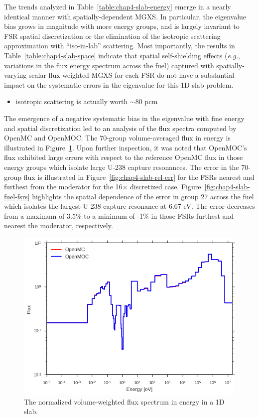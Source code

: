 The trends analyzed in Table~\ref{table:chap4-slab-energy} emerge in a nearly identical manner with spatially-dependent \ac{MGXS}. In particular, the eigenvalue bias grows in magnitude with more energy groups, and is largely invariant to \ac{FSR} spatial discretization or the elimination of the isotropic scattering approximation with ``iso-in-lab'' scattering. Most importantly, the results in Table~\ref{table:chap4-slab-space} indicate that spatial self-shielding effects (\textit{e.g.}, variations in the flux energy spectrum across the fuel) captured with spatially-varying scalar flux-weighted \ac{MGXS} for each \ac{FSR} do not have a substantial impact on the systematic errors in the eigenvalue for this 1D slab problem.

\begin{itemize}[noitemsep]
\item isotropic scattering is actually worth $\sim$80 pcm
\end{itemize}

The emergence of a negative systematic bias in the eigenvalue with fine energy and spatial discretization led to an analysis of the flux spectra computed by OpenMC and OpenMOC. The 70-group volume-averaged flux in energy is illustrated in Figure~\ref{fig:chap4-slab-flux}. Upon further inspection, it was noted that OpenMOC's flux exhibited large errors with respect to the reference OpenMC flux in those energy groups which isolate large U-238 capture resonances. The error in the 70-group flux is illustrated in Figure~\ref{fig:chap4-slab-rel-err} for the \ac{FSR}s nearest and furthest from the moderator for the 16$\times$ discretized case. Figure~\ref{fig:chap4-slab-fuel-fsrs} highlights the spatial dependence of the error in group 27 across the fuel which isolates the largest U-238 capture resonance at 6.67 eV. The error decreases from a maximum of 3.5\% to a minimum of -1\% in those \ac{FSR}s furthest and nearest the moderator, respectively.

\begin{figure}[H]
  \centering
  \includegraphics[width=0.75\linewidth]{figures/biases/slab/vol-avg-flux}
\caption[Flux spectrum in a 1D slab.]{The normalized volume-weighted flux spectrum in energy in a 1D slab.}
\label{fig:chap4-slab-flux}
\end{figure}

